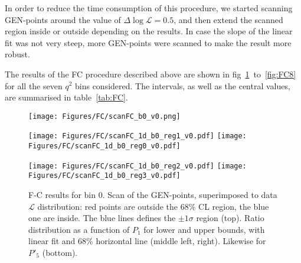 In order to reduce the time consumption of this procedure, we started scanning GEN-points around the value of $\Delta\log\mathcal{L}=0.5$, and then extend the scanned region inside or outside depending on the results.
In case the slope of the linear fit was not very steep, more GEN-points were scanned to make the result more robust.


The results of the FC procedure described above are shown in fig~\ref{fig:FC0}~to~\ref{fig:FC8} for all the seven $q^2$ bins considered.
The intervals, as well as the central values, are summarised in table~\ref{tab:FC}.

\begin{figure}
  \centering
  \texttt{[image: Figures/FC/scanFC\_b0\_v0.png]}

  \texttt{[image: Figures/FC/scanFC\_1d\_b0\_reg1\_v0.pdf]}
  \texttt{[image: Figures/FC/scanFC\_1d\_b0\_reg0\_v0.pdf]}

  \texttt{[image: Figures/FC/scanFC\_1d\_b0\_reg2\_v0.pdf]}
  \texttt{[image: Figures/FC/scanFC\_1d\_b0\_reg3\_v0.pdf]}

  \caption{F-C results for bin 0.
    Scan of the GEN-points, superimposed to data $\mathcal{L}$ distribution: red points are outside the 68\% CL region, the blue one are inside.
    The blue lines defines the $\pm1\sigma$ region (top).
    Ratio distribution as a function of $P_1$ for lower and upper bounds, with linear fit and 68\% horizontal line (middle left, right).
    Likewise for $P'_5$ (bottom).}
  \label{fig:FC0}
\end{figure}

